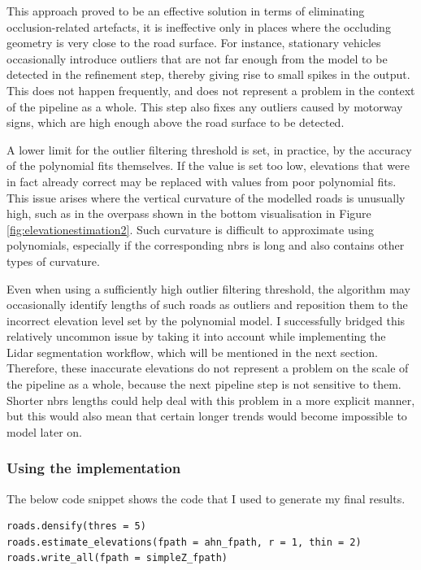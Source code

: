 This approach proved to be an effective solution in terms of eliminating occlusion-related artefacts, it is ineffective only in places where the occluding geometry is very close to the road surface. For instance, stationary vehicles occasionally introduce outliers that are not far enough from the model to be detected in the refinement step, thereby giving rise to small spikes in the output. This does not happen frequently, and does not represent a problem in the context of the pipeline as a whole. This step also fixes any outliers caused by motorway signs, which are high enough above the road surface to be detected.

A lower limit for the outlier filtering threshold is set, in practice, by the accuracy of the polynomial fits themselves. If the value is set too low, elevations that were in fact already correct may be replaced with values from poor polynomial fits. This issue arises where the vertical curvature of the modelled roads is unusually high, such as in the overpass shown in the bottom visualisation in Figure \ref{fig:elevationestimation2}. Such curvature is difficult to approximate using polynomials, especially if the corresponding \ac{nbrs} is long and also contains other types of curvature.

Even when using a sufficiently high outlier filtering threshold, the algorithm may occasionally identify lengths of such roads as outliers and reposition them to the incorrect elevation level set by the polynomial model. I successfully bridged this relatively uncommon issue by taking it into account while implementing the Lidar segmentation workflow, which will be mentioned in the next section. Therefore, these inaccurate elevations do not represent a problem on the scale of the pipeline as a whole, because the next pipeline step is not sensitive to them. Shorter \ac{nbrs} lengths could help deal with this problem in a more explicit manner, but this would also mean that certain longer trends would become impossible to model later on.

\subsubsection{Using the implementation}

The below code snippet shows the code that I used to generate my final results.

\begin{verbatim}
roads.densify(thres = 5)
roads.estimate_elevations(fpath = ahn_fpath, r = 1, thin = 2)
roads.write_all(fpath = simpleZ_fpath)
\end{verbatim}

